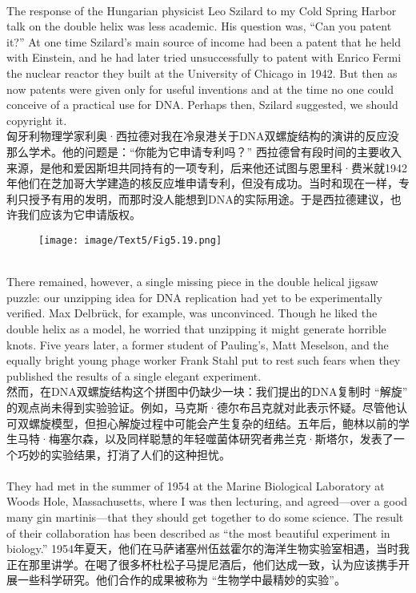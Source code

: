 \documentclass{article}
\begin{document}
\\
The response of the Hungarian physicist Leo Szilard to my Cold Spring Harbor talk on the double helix was less academic. His question was, “Can you patent it?” At one time Szilard’s main source of income had been a patent that he held with Einstein, and he had later tried unsuccessfully to patent with Enrico Fermi the nuclear reactor they built at the University of Chicago in 1942. But then as now patents were given only for useful inventions and at the time no one could conceive of a practical use for DNA. Perhaps then, Szilard suggested, we should copyright it.\\
匈牙利物理学家利奥·西拉德对我在冷泉港关于DNA双螺旋结构的演讲的反应没那么学术。他的问题是：“你能为它申请专利吗？” 西拉德曾有段时间的主要收入来源，是他和爱因斯坦共同持有的一项专利，后来他还试图与恩里科·费米就1942年他们在芝加哥大学建造的核反应堆申请专利，但没有成功。当时和现在一样，专利只授予有用的发明，而那时没人能想到DNA的实际用途。于是西拉德建议，也许我们应该为它申请版权。\\

\begin{figure}
    \centering
    \texttt{[image: image/Text5/Fig5.19.png]}
\end{figure}

\\
There remained, however, a single missing piece in the double helical jigsaw puzzle: our unzipping idea for DNA replication had yet to be experimentally verified. Max Delbrück, for example, was unconvinced. Though he liked the double helix as a model, he worried that unzipping it might generate horrible knots. Five years later, a former student of Pauling’s, Matt Meselson, and the equally bright young phage worker Frank Stahl put to rest such fears when they published the results of a single elegant experiment.\\
然而，在DNA双螺旋结构这个拼图中仍缺少一块：我们提出的DNA复制时 “解旋” 的观点尚未得到实验验证。例如，马克斯·德尔布吕克就对此表示怀疑。尽管他认可双螺旋模型，但担心解旋过程中可能会产生复杂的纽结。五年后，鲍林以前的学生马特·梅塞尔森，以及同样聪慧的年轻噬菌体研究者弗兰克·斯塔尔，发表了一个巧妙的实验结果，打消了人们的这种担忧。 \\

\\
They had met in the summer of 1954 at the Marine Biological Laboratory at Woods Hole, Massachusetts, where I was then lecturing, and agreed—over a good many gin martinis—that they should get together to do some science. The result of their collaboration has been described as “the most beautiful experiment in biology.”
1954年夏天，他们在马萨诸塞州伍兹霍尔的海洋生物实验室相遇，当时我正在那里讲学。在喝了很多杯杜松子马提尼酒后，他们达成一致，认为应该携手开展一些科学研究。他们合作的成果被称为 “生物学中最精妙的实验”。 \\
\end{document}
